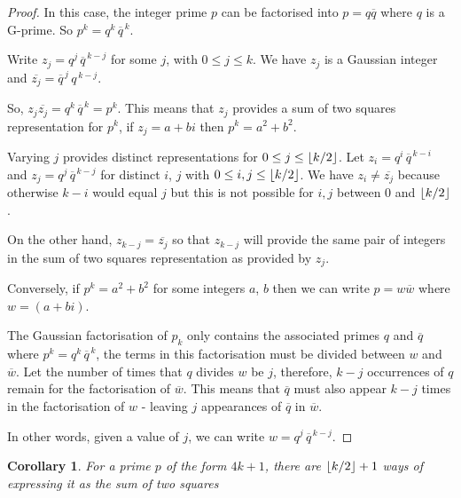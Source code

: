 \documentclass[11pt]{amsart}
\newtheorem{corollary}{Corollary}[section]
\begin{document}
\begin{proof}


In this case, the integer prime $p$ can be factorised into $p = q \overline{q}$ where $q$ is a G-prime. So $p^{k}= q^{k} \, \overline{q}^{\,k}$.

Write $z_{j} =  q^{j} \, \overline{q}^{\,k - j}$ for some $j$, with $0 \le j \le k$.
We have $z_{j}$ is a Gaussian integer and $\overline{z_{j}} = \overline{q}^{\, j} \, q^{\,k - j}$. 

So, $z_{j} \overline{z_{j}} = q^{k} \, \overline{q}^{\,k} = p^{k}$. This means that $z_{j}$ provides a sum of two squares representation for $p^{k}$, if $z_{j} = a + b i$ then $p^{k} = a^{2} + b^{2}$.

Varying $j$ provides distinct representations for $0 \le j \le  \left\lfloor {k/2} \right\rfloor $. 
Let $z_{i} = q^{i} \, \overline{q}^{\,k - i}$ and $z_{j} = q^{j} \, \overline{q}^{\,k - j}$ for distinct $i$, $j$ with $0 \le i,j \le  \left\lfloor {k/2} \right\rfloor $. We have $z_{i} \ne \overline{z_{j}}$ because otherwise $k-i$ would equal $j$ but this is not possible for $i,j$ between 0 and $ \left\lfloor {k/2} \right\rfloor $.

On the other hand, $z_{k-j} =  \overline{z_{j}}$ so that $z_{k-j}$ will provide the same pair of integers in the sum of two squares representation as provided by $z_{j}$.

\vspace{1em}

Conversely, if $p^{k} = a^{2} + b^{2}$ for some integers $a$, $b$ then we can write $p = w \overline{w}$ where $w =  (a + b i) $.

The Gaussian factorisation of $p_{k}$ only contains the associated primes $q$ and $\overline{q}$ where $p^{k}= q^{k} \, \overline{q}^{\,k}$, the terms in this factorisation must be divided between $w$ and $\overline{w}$. Let the number of times that $q$ divides $w$ be $j$, therefore, $k-j$ occurrences of $q$ remain for the factorisation of $\overline{w}$.
This means that $\overline{q}$ must also appear $k-j$ times in the factorisation of $w$ - leaving $j$ appearances of $\overline{q}$ in $\overline{w}$.

In other words, given a value of $j$, we can write  $w = q^{j} \, \overline{q}^{\,k - j}$.

\end{proof}


\begin{corollary}
For a prime $p$ of the form $4k+1$, there are $ \left\lfloor {k/2} \right\rfloor  + 1$ ways of expressing it as the sum of two squares
\end{corollary}
\end{document}
